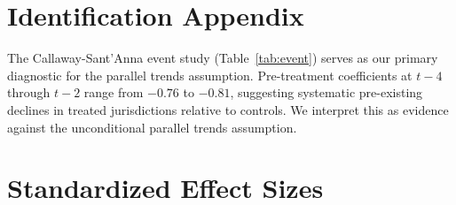 \documentclass[12pt]{article}
\begin{document}
\section{Identification Appendix}

The Callaway-Sant'Anna event study (Table~\ref{tab:event}) serves as our primary diagnostic for the parallel trends assumption. Pre-treatment coefficients at $t-4$ through $t-2$ range from $-0.76$ to $-0.81$, suggesting systematic pre-existing declines in treated jurisdictions relative to controls. We interpret this as evidence against the unconditional parallel trends assumption.

\section{Standardized Effect Sizes}
\label{sec:sde}


\end{document}
